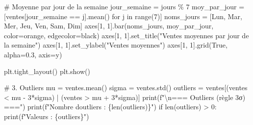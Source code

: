 \documentclass[
  french,
  11pt,
  a4paper,
]{scrbook}
\newenvironment{Shaded}{}{}
\newcommand{\BuiltInTok}[1]{\textcolor[rgb]{0.84,0.23,0.29}{#1}}
\newcommand{\CharTok}[1]{\textcolor[rgb]{0.01,0.18,0.38}{#1}}
\newcommand{\CommentTok}[1]{\textcolor[rgb]{0.42,0.45,0.49}{#1}}
\newcommand{\ControlFlowTok}[1]{\textcolor[rgb]{0.84,0.23,0.29}{#1}}
\newcommand{\DecValTok}[1]{\textcolor[rgb]{0.00,0.36,0.77}{#1}}
\newcommand{\FloatTok}[1]{\textcolor[rgb]{0.00,0.36,0.77}{#1}}
\newcommand{\KeywordTok}[1]{\textcolor[rgb]{0.84,0.23,0.29}{#1}}
\newcommand{\NormalTok}[1]{\textcolor[rgb]{0.14,0.16,0.18}{#1}}
\newcommand{\OperatorTok}[1]{\textcolor[rgb]{0.14,0.16,0.18}{#1}}
\newcommand{\SpecialCharTok}[1]{\textcolor[rgb]{0.00,0.36,0.77}{#1}}
\newcommand{\SpecialStringTok}[1]{\textcolor[rgb]{0.01,0.18,0.38}{#1}}
\newcommand{\StringTok}[1]{\textcolor[rgb]{0.01,0.18,0.38}{#1}}
\newcommand{\VariableTok}[1]{\textcolor[rgb]{0.89,0.38,0.04}{#1}}
\begin{document}
\begin{tcolorbox}
\begin{Shaded}
\begin{Highlighting}[]
\CommentTok{\# Moyenne par jour de la semaine}
\NormalTok{jour\_semaine }\OperatorTok{=}\NormalTok{ jours }\OperatorTok{\%} \DecValTok{7}
\NormalTok{moy\_par\_jour }\OperatorTok{=}\NormalTok{ [ventes[jour\_semaine }\OperatorTok{==}\NormalTok{ j].mean() }\ControlFlowTok{for}\NormalTok{ j }\KeywordTok{in} \BuiltInTok{range}\NormalTok{(}\DecValTok{7}\NormalTok{)]}
\NormalTok{noms\_jours }\OperatorTok{=}\NormalTok{ [}\StringTok{\textquotesingle{}Lun\textquotesingle{}}\NormalTok{, }\StringTok{\textquotesingle{}Mar\textquotesingle{}}\NormalTok{, }\StringTok{\textquotesingle{}Mer\textquotesingle{}}\NormalTok{, }\StringTok{\textquotesingle{}Jeu\textquotesingle{}}\NormalTok{, }\StringTok{\textquotesingle{}Ven\textquotesingle{}}\NormalTok{, }\StringTok{\textquotesingle{}Sam\textquotesingle{}}\NormalTok{, }\StringTok{\textquotesingle{}Dim\textquotesingle{}}\NormalTok{]}
\NormalTok{axes[}\DecValTok{1}\NormalTok{, }\DecValTok{1}\NormalTok{].bar(noms\_jours, moy\_par\_jour, color}\OperatorTok{=}\StringTok{\textquotesingle{}orange\textquotesingle{}}\NormalTok{, edgecolor}\OperatorTok{=}\StringTok{\textquotesingle{}black\textquotesingle{}}\NormalTok{)}
\NormalTok{axes[}\DecValTok{1}\NormalTok{, }\DecValTok{1}\NormalTok{].set\_title(}\StringTok{"Ventes moyennes par jour de la semaine"}\NormalTok{)}
\NormalTok{axes[}\DecValTok{1}\NormalTok{, }\DecValTok{1}\NormalTok{].set\_ylabel(}\StringTok{"Ventes moyennes"}\NormalTok{)}
\NormalTok{axes[}\DecValTok{1}\NormalTok{, }\DecValTok{1}\NormalTok{].grid(}\VariableTok{True}\NormalTok{, alpha}\OperatorTok{=}\FloatTok{0.3}\NormalTok{, axis}\OperatorTok{=}\StringTok{\textquotesingle{}y\textquotesingle{}}\NormalTok{)}

\NormalTok{plt.tight\_layout()}
\NormalTok{plt.show()}

\CommentTok{\# 3. Outliers}
\NormalTok{mu }\OperatorTok{=}\NormalTok{ ventes.mean()}
\NormalTok{sigma }\OperatorTok{=}\NormalTok{ ventes.std()}
\NormalTok{outliers }\OperatorTok{=}\NormalTok{ ventes[(ventes }\OperatorTok{\textless{}}\NormalTok{ mu }\OperatorTok{{-}} \DecValTok{3}\OperatorTok{*}\NormalTok{sigma) }\OperatorTok{|}\NormalTok{ (ventes }\OperatorTok{\textgreater{}}\NormalTok{ mu }\OperatorTok{+} \DecValTok{3}\OperatorTok{*}\NormalTok{sigma)]}
\BuiltInTok{print}\NormalTok{(}\SpecialStringTok{f"}\CharTok{\textbackslash{}n}\SpecialStringTok{=== Outliers (règle 3σ) ==="}\NormalTok{)}
\BuiltInTok{print}\NormalTok{(}\SpecialStringTok{f"Nombre d\textquotesingle{}outliers : }\SpecialCharTok{\{}\BuiltInTok{len}\NormalTok{(outliers)}\SpecialCharTok{\}}\SpecialStringTok{"}\NormalTok{)}
\ControlFlowTok{if} \BuiltInTok{len}\NormalTok{(outliers) }\OperatorTok{\textgreater{}} \DecValTok{0}\NormalTok{:}
    \BuiltInTok{print}\NormalTok{(}\SpecialStringTok{f"Valeurs : }\SpecialCharTok{\{}\NormalTok{outliers}\SpecialCharTok{\}}\SpecialStringTok{"}\NormalTok{)}


\end{Highlighting}
\end{Shaded}
\end{tcolorbox}
\end{document}
